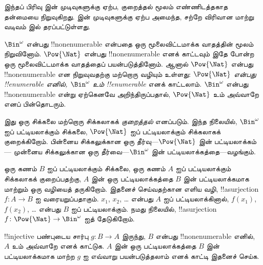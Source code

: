 \documentclass[../../../include/open-logic-section]{subfiles}
\begin{document}


\begin{editorial}
  இந்தப் பிரிவு  இன் முடிவுகளுக்கு ஏற்ப,
  குறைத்தல் மூலம் எண்ணிடத்தகாத தன்மையை நிறுவுகிறது.
   இன் முடிவுகளுக்கு ஏற்ப அமைந்த,
  சற்றே விரிவான மாற்று வடிவம்  இல் தரப்பட்டுள்ளது.
\end{editorial}

$\Bin^\omega$ என்பது !!{nonenumerable} என்பதை
ஒரு மூலைவிட்டமாக்க வாதத்தின் மூலம் நிறுவினோம்.
$\Pow{\Nat}$ என்பது !!{nonenumerable} எனக் காட்டவும்
இதே போன்ற ஒரு மூலைவிட்டமாக்க வாதத்தைப் பயன்படுத்தினோம்.
ஆனால் $\Pow{\Nat}$ என்பது !!{nonenumerable} என நிறுவுவதற்கு
மற்றொரு வழியும் உள்ளது:
\emph{$\Pow{\Nat}$ என்பது !!{enumerable} எனில்,
$\Bin^\omega$ உம் !!{enumerable}} எனக் காட்டலாம்.
$\Bin^\omega$ என்பது !!{nonenumerable} என்று ஏற்கெனவே
அறிந்திருப்பதால், $\Pow{\Nat}$ உம் அவ்வாறே எனப் பின்தொடரும்.

இது ஒரு சிக்கலை மற்றொரு சிக்கலாகக் \emph{குறைத்தல்} எனப்படும்.
இந்த நிலையில், $\Bin^\omega$ ஐப் பட்டியலாக்கும் சிக்கலை,
$\Pow{\Nat}$ ஐப் பட்டியலாக்கும் சிக்கலாகக் குறைக்கிறோம்.
பின்னைய சிக்கலுக்கான ஒரு தீர்வு---$\Pow{\Nat}$ இன் பட்டியலாக்கம்---
முன்னைய சிக்கலுக்கான ஒரு தீர்வை---$\Bin^\omega$ இன்
பட்டியலாக்கத்தை---வழங்கும்.

ஒரு கணம் $B$ ஐப் பட்டியலாக்கும் சிக்கலை,
ஒரு கணம் $A$ ஐப் பட்டியலாக்கும் சிக்கலாகக் குறைப்பதற்கு,
$A$ இன் ஒரு பட்டியலாக்கத்தை $B$ இன் பட்டியலாக்கமாக மாற்றும்
ஒரு வழியைத் தருகிறோம்.
இதனைச் செய்வதற்கான எளிய வழி,
!!a{surjection} $f\colon A \to B$ ஐ வரையறுப்பதாகும்.
$x_1$, $x_2$, \dots{} என்பது $A$ ஐப் பட்டியலாக்கினால்,
$f(x_1)$, $f(x_2)$, \dots{} என்பது $B$ ஐப் பட்டியலாக்கும்.
நமது நிலையில், !!a{surjection} $f\colon \Pow{\Nat}
\to \Bin^\omega$ ஐத் தேடுகிறோம்.

\begin{prob}
!!{injective} பண்புடைய சார்பு $g\colon B \to A$ இருந்து,
$B$ என்பது !!{nonenumerable} எனில்,
$A$ உம் அவ்வாறே எனக் காட்டுக.
$A$ இன் ஒரு பட்டியலாக்கத்தை $B$ இன் பட்டியலாக்கமாக மாற்ற
$g$ ஐ எவ்வாறு பயன்படுத்தலாம் எனக் காட்டி இதனைச் செய்க.
\end{prob}
\end{document}
